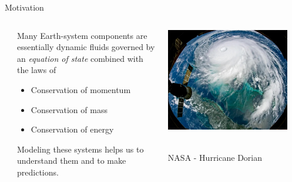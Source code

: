 \documentclass[aspectratio=169,xcolor=dvipsnames]{beamer}
\newcommand\credit[2]{
        \\ \vspace{-0.5em}
        {\color{gray}\scriptsize
        \hfill
        #1
        \hspace{#2}}
        }
\begin{document}
\begin{frame}[plain]
  \titlepage
\end{frame}


\begin{frame}{Motivation}

    \begin{columns}
        \begin{column}{0.02\textwidth}
        \end{column}
        \begin{column}{0.5\textwidth}
          
          \vspace{0.3cm}
          
          Many Earth-system components are essentially dynamic fluids governed by an \emph{equation of state} combined with the laws of 
          
          \vspace{0.3cm}
          
          \begin{itemize}
              \item Conservation of momentum 
              \item Conservation of mass 
              \item Conservation of energy
          \end{itemize}
          
          \vspace{0.3cm}

          Modeling these systems helps us to understand them and to make predictions.
        \end{column}
          
        \begin{column}{0.48\textwidth}
            \centering
            \includegraphics[width=0.9\textwidth]{figs/Fig-nasa-dorian.jpg}
            \credit{NASA - Hurricane Dorian}{5pt}
        \end{column}
    \end{columns}
    
\end{frame}
\end{document}
